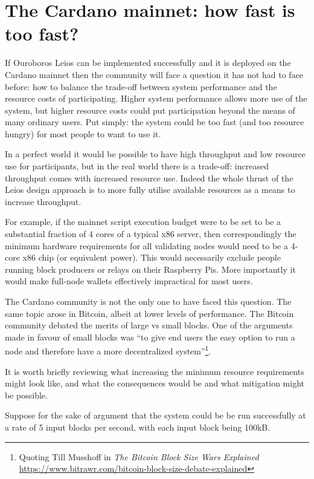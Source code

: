 \documentclass[11pt,a4paper]{article}
\begin{document}
\section{The Cardano mainnet: how fast is too fast?}
\label{sec:how-fast}

If Ouroboros Leios can be implemented successfully and it is deployed on the
Cardano mainnet then the community will face a question it has not had to face
before: how to balance the trade-off between system performance and the
resource costs of participating. Higher system performance allows more use of
the system, but higher resource costs could put participation beyond the means
of many ordinary users. Put simply: the system could be too fast (and too
resource hungry) for most people to want to use it.

In a perfect world it would be possible to have high throughput and low
resource use for participants, but in the real world there is a trade-off:
increased throughput comes with increased resource use. Indeed the whole thrust
of the Leios design approach is to more fully utilise available resources as a
means to increase throughput.

For example, if the mainnet script execution budget were to be set to be a
substantial fraction of 4 cores of a typical x86 server, then correspondingly
the minimum hardware requirements for all validating nodes would need to be a
4-core x86 chip (or equivalent power). This would necessarily exclude people
running block producers or relays on their Raspberry Pis. More importantly it
would make full-node wallets effectively impractical for most users.

The Cardano community is not the only one to have faced this question. The same
topic arose in Bitcoin, albeit at lower levels of performance. The Bitcoin
community debated the merits of large vs small blocks. One of the arguments
made in favour of small blocks was ``to give end users the easy option to run a
node and therefore have a more decentralized system''\footnote{Quoting Till
Musshoff in \emph{The Bitcoin Block Size Wars Explained} \\
\url{https://www.bitrawr.com/bitcoin-block-size-debate-explained}}.

It is worth briefly reviewing what increasing the minimum resource requirements
might look like, and what the consequences would be and what mitigation might
be possible.

Suppose for the sake of argument that the system could be be run successfully
at a rate of 5 input blocks per second, with each input block being 100kB.
\end{document}
